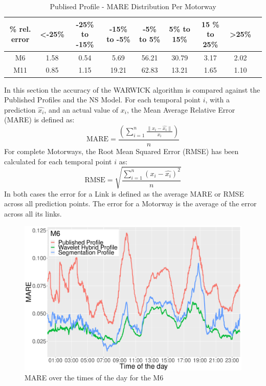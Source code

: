 \documentclass[a4paper, 10pt, conference]{ieeeconf}      %
\begin{document}
\begin{table}[bp]
	\caption{Publised Profile - MARE Distribution Per Motorway}
	\centering
	\begin{center}
		\begin{tabular}{|C|C|C|C|C|C|C|C|C|}
			\hline
			\textbf{\% rel. error}&{\textless -25\%}&{-25\%\textbf{ to }-15\%}&{-15\%\textbf{ to }-5\%}&{-5\%\textbf{ to }5\%}&{5\%\textbf{ to }15\%}&{15 \%\textbf{ to }25\%}&{\textgreater 25\%}\\
			\hline
			M6& 1.58& 0.54& 5.69& 56.21& 30.79& 3.17& 2.02\\
			\hline
			M11& 0.85& 1.15& 19.21& 62.83& 13.21& 1.65& 1.10\\
			\hline
		\end{tabular}
		\label{mapeglobal}
	\end{center}
\end{table}
In this section the accuracy of the WARWICK algorithm is compared against the Published Profiles and the NS Model. 
For each temporal point $i$, with a prediction $\hat{x_i}$, and an actual value of $x_i$, the Mean Average Relative Error (MARE) is defined as:
\begin{equation}
\textrm{MARE} =\frac{ \left( \sum_{i=1}^{n} \frac{\|x_i - \hat{x_i}\|}{x_i}\right)}{n}
\end{equation}
For complete Motorways, the Root Mean Squared Error (RMSE) has been calculated for each temporal point $i$ as:
\begin{equation}
\textrm{RMSE} = \sqrt{\frac{\sum_{i=1}^{n} (x_i - \hat{x_i})^2}{n}}
\end{equation}
In both cases the error for a Link is defined as the average MARE or RMSE across all prediction points.
The error for a Motorway is the average of the error across all its links.
\begin{figure}[htbp]
	\centerline{\includegraphics[width=\linewidth]{./images/M6_daytime_8_12.pdf}}
	\caption{MARE over the times of the day for the M6}
	\label{fig:m6dt}
\end{figure}
\end{document}

